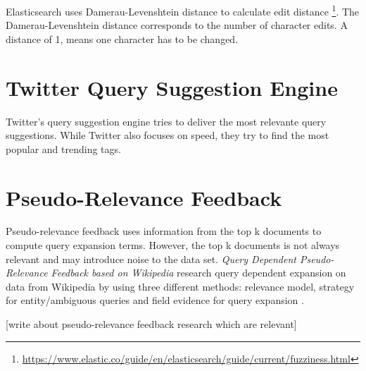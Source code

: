 Elasticsearch uses Damerau-Levenshtein distance to calculate edit distance \footnote{\url{https://www.elastic.co/guide/en/elasticsearch/guide/current/fuzziness.html}}.
The Damerau-Levenshtein distance corresponds to the number of character edits.
A distance of 1, means one character has to be changed.

\section{Twitter Query Suggestion Engine}
Twitter’s query suggestion engine \cite{twitter-suggestion} tries to deliver the most relevante query suggestions.
While Twitter also focuses on speed, they try to find the most popular and trending tags.

\section{Pseudo-Relevance Feedback}
Pseudo-relevance feedback uses information from the top k documents to compute query expansion terms.
However, the top k documents is not always relevant and may introduce noise to the data set.
\textit{Query Dependent Pseudo-Relevance Feedback based on Wikipedia} research query dependent expansion on data from Wikipedia by using three different methods:
relevance model, strategy for entity/ambiguous queries and field evidence for query expansion \cite{pseudo-relevance-wikipedia}.

[write about pseudo-relevance feedback research which are relevant]
